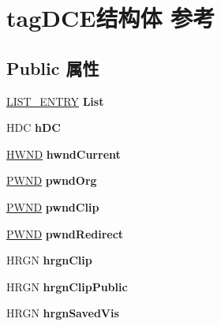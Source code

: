 \hypertarget{structtag_d_c_e}{}\section{tag\+D\+C\+E结构体 参考}
\label{structtag_d_c_e}
\subsection*{Public 属性}
\begin{DoxyCompactItemize}
\item 
\mbox{\label{structtag_d_c_e_a1acd2b3101d936d89705850f3c8f123c}} 
\hyperlink{struct___l_i_s_t___e_n_t_r_y}{L\+I\+S\+T\+\_\+\+E\+N\+T\+RY} {\bfseries List}
\item 
\mbox{\label{structtag_d_c_e_a5a432844267378e0ad46bbbfc4a74c43}} 
H\+DC {\bfseries h\+DC}
\item 
\mbox{\label{structtag_d_c_e_ae41a45b1185b0e328e9482a56b818fa5}} 
\hyperlink{interfacevoid}{H\+W\+ND} {\bfseries hwnd\+Current}
\item 
\mbox{\label{structtag_d_c_e_a79f1407572884daa895b5cd031ecdaf1}} 
\hyperlink{struct___w_n_d}{P\+W\+ND} {\bfseries pwnd\+Org}
\item 
\mbox{\label{structtag_d_c_e_a5230f3927b92d3ccc49d58bd165c328e}} 
\hyperlink{struct___w_n_d}{P\+W\+ND} {\bfseries pwnd\+Clip}
\item 
\mbox{\label{structtag_d_c_e_aa4d07c8f4db268fb80a6f6c64583d108}} 
\hyperlink{struct___w_n_d}{P\+W\+ND} {\bfseries pwnd\+Redirect}
\item 
\mbox{\label{structtag_d_c_e_a122853249a6e56537b2cb657d4c06a7d}} 
H\+R\+GN {\bfseries hrgn\+Clip}
\item 
\mbox{\label{structtag_d_c_e_a3a1a591b8b61344a7e874bb0290bf5a1}} 
H\+R\+GN {\bfseries hrgn\+Clip\+Public}
\item 
\mbox{\label{structtag_d_c_e_a8b929dd49b5504a29054e4b1607645cd}} 
H\+R\+GN {\bfseries hrgn\+Saved\+Vis}
\item 

\end{DoxyCompactItemize}
